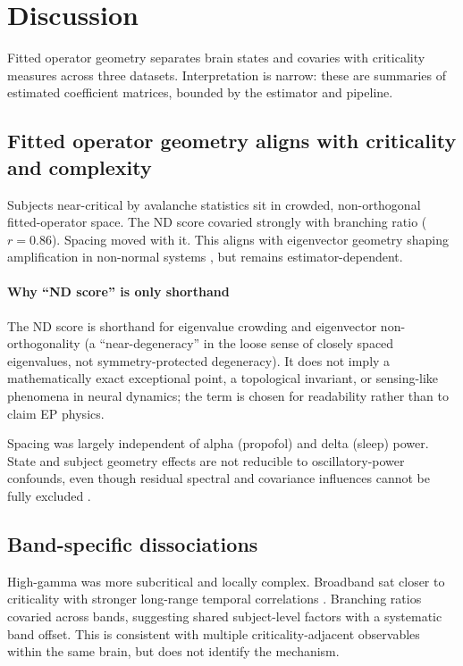 \documentclass[preprint,12pt,nonatbib]{elsarticle}
\begin{document}
\section{Discussion}

Fitted operator geometry separates brain states and covaries with criticality measures across three datasets. Interpretation is narrow: these are summaries of estimated coefficient matrices, bounded by the estimator and pipeline.

\subsection{Fitted operator geometry aligns with criticality and complexity}
Subjects near-critical by avalanche statistics sit in crowded, non-orthogonal fitted-operator space. The ND score covaried strongly with branching ratio ($r=0.86$). Spacing moved with it. This aligns with eigenvector geometry shaping amplification in non-normal systems \citep{Schomerus2024,Kullig2025,Fyodorov2025,Zou2024}, but remains estimator-dependent.

\paragraph{Why ``ND score'' is only shorthand} The ND score is shorthand for eigenvalue crowding and eigenvector non-orthogonality (a ``near-degeneracy'' in the loose sense of closely spaced eigenvalues, not symmetry-protected degeneracy). It does not imply a mathematically exact exceptional point, a topological invariant, or sensing-like phenomena in neural dynamics; the term is chosen for readability rather than to claim EP physics.

Spacing was largely independent of alpha (propofol) and delta (sleep) power. State and subject geometry effects are not reducible to oscillatory-power confounds, even though residual spectral and covariance influences cannot be fully excluded \citep{GirardiSchappo2021,Hengen2025}.

\subsection{Band-specific dissociations}
High-gamma was more subcritical and locally complex. Broadband sat closer to criticality with stronger long-range temporal correlations \citep{Li2024,Grubov2025}. Branching ratios covaried across bands, suggesting shared subject-level factors with a systematic band offset. This is consistent with multiple criticality-adjacent observables within the same brain, but does not identify the mechanism.
\end{document}
